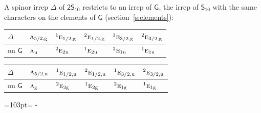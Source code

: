 \documentclass[10pt,a4paper]{article}
\newcommand{\needspace}[1]{\par\penalty-100\begingroup\dimen0=#1\relax\dimen2=\pagegoal
  \advance\dimen2-\pagetotal\ifdim\dimen0>\dimen2\relax\ifdim\dimen2>0pt\vfil\break\fi\fi
  \endgroup}
\numberwithin{equation}{section}
\newcommand{\grp}[1]{\mathsf{#1}}
\newcommand{\irr}[1]{\text{\normalfont\scshape #1}}
\newcommand{\conjpair}[1]{{}^{#1}}
\newcommand{\ptag}[1]{\mathrm{#1}}
\begin{document}
A spinor irrep $\Delta$ of \href{2S10.pdf}{$\grp{2S_{10}}$} restricts to an irrep of $\grp{G}$, the irrep of $\grp{S_{10}}$ with the same characters on the elements of $\grp{G}$ (section~\ref{s:elements}):
\begin{center}\begin{tabular}{@{}llllll@{}}\toprule
$\Delta$ & $\irr{a}_{5/2,\ptag{g}}$ & $\conjpair{1}\irr{e}_{1/2,\ptag{g}}$ & $\conjpair{2}\irr{e}_{1/2,\ptag{g}}$ & $\conjpair{1}\irr{e}_{3/2,\ptag{g}}$ & $\conjpair{2}\irr{e}_{3/2,\ptag{g}}$\\\midrule
on $\grp{G}$ & $\irr{a}_{\ptag{u}}$ & $\conjpair{2}\irr{e}_{2\ptag{u}}$ & $\conjpair{1}\irr{e}_{2\ptag{u}}$ & $\conjpair{2}\irr{e}_{1\ptag{u}}$ & $\conjpair{1}\irr{e}_{1\ptag{u}}$\\
\bottomrule\end{tabular}\end{center}
\begin{center}\begin{tabular}{@{}llllll@{}}\toprule
$\Delta$ & $\irr{a}_{5/2,\ptag{u}}$ & $\conjpair{1}\irr{e}_{1/2,\ptag{u}}$ & $\conjpair{2}\irr{e}_{1/2,\ptag{u}}$ & $\conjpair{1}\irr{e}_{3/2,\ptag{u}}$ & $\conjpair{2}\irr{e}_{3/2,\ptag{u}}$\\\midrule
on $\grp{G}$ & $\irr{a}_{\ptag{g}}$ & $\conjpair{2}\irr{e}_{2\ptag{g}}$ & $\conjpair{1}\irr{e}_{2\ptag{g}}$ & $\conjpair{2}\irr{e}_{1\ptag{g}}$ & $\conjpair{1}\irr{e}_{1\ptag{g}}$\\
\bottomrule\end{tabular}\end{center}
\needspace{103pt}
\end{document}
